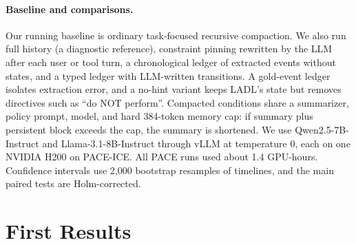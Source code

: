\documentclass[11pt]{article}
\newcommand{\ours}{\textsc{LADL}\xspace}
\begin{document}
\paragraph{Baseline and comparisons.} Our running baseline is ordinary task-focused recursive compaction. We also run full history (a diagnostic reference), constraint pinning rewritten by the LLM after each user or tool turn, a chronological ledger of extracted events without states, and a typed ledger with LLM-written transitions. A gold-event ledger isolates extraction error, and a no-hint variant keeps \ours's state but removes directives such as ``do NOT perform''. Compacted conditions share a summarizer, policy prompt, model, and hard 384-token memory cap: if summary plus persistent block exceeds the cap, the summary is shortened. We use Qwen2.5-7B-Instruct and Llama-3.1-8B-Instruct through vLLM \citep{kwon2023vllm} at temperature 0, each on one NVIDIA H200 on PACE-ICE. All PACE runs used about 1.4 GPU-hours. Confidence intervals use 2,000 bootstrap resamples of timelines, and the main paired tests are Holm-corrected.

\section{First Results}

\begin{table}[t]
\centering\small\setlength{\tabcolsep}{3pt}
\resizebox{\textwidth}{!}{}
\caption{Decision accuracy (\%) under a hard 384-token memory cap on PACE-ICE, for the original test split (Test, 664 probes) and 52 new timelines (Fresh, 912 probes). Accuracy is four-way with timeline-clustered 95\% CIs. Exec.: post-hoc accuracy of the binary execute versus do-not-execute decision on Fresh. Tok.: mean memory tokens after the first compaction on Test.}
\label{tab:main}
\end{table}

\begin{table}[t]
\centering\small\setlength{\tabcolsep}{3pt}
\resizebox{\textwidth}{!}{}
\caption{Paired accuracy differences in percentage points under the hard cap, with 95\% timeline-bootstrap CIs. $\Delta$Exec.\ is measured on Fresh. $^{*}$: Holm-corrected two-sided $p<0.05$ over the 12 tests of one split and metric.}
\label{tab:paired}
\end{table}
\end{document}

